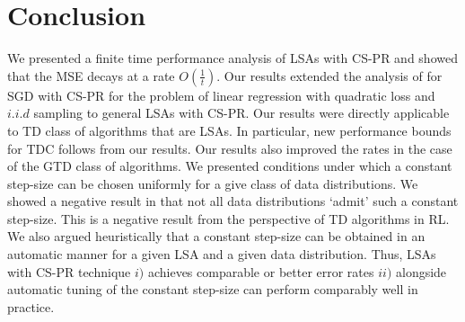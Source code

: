 \section{Conclusion}
We presented a finite time performance analysis of LSAs with CS-PR and showed that the MSE decays at a rate $O(\frac{1}{t})$. Our results extended the analysis of \citet{bach} for SGD with CS-PR for the problem of linear regression with quadratic loss and $i.i.d$ sampling to general LSAs with CS-PR. Our results were directly applicable to TD class of algorithms that are LSAs. In particular, new performance bounds for TDC follows from our results. Our results also improved the rates in the case of the GTD class of algorithms. We presented conditions under which a constant step-size can be chosen uniformly for a give class of data distributions. We showed a negative result in that not all data distributions `admit' such a constant step-size. This is a negative result from the perspective of TD algorithms in RL. We also argued heuristically that a constant step-size can be obtained in an automatic manner for a given LSA and a given data distribution. Thus, LSAs with CS-PR technique $i)$ achieves comparable or better error rates $ii)$ alongside automatic tuning of the constant step-size can perform comparably well in practice.
